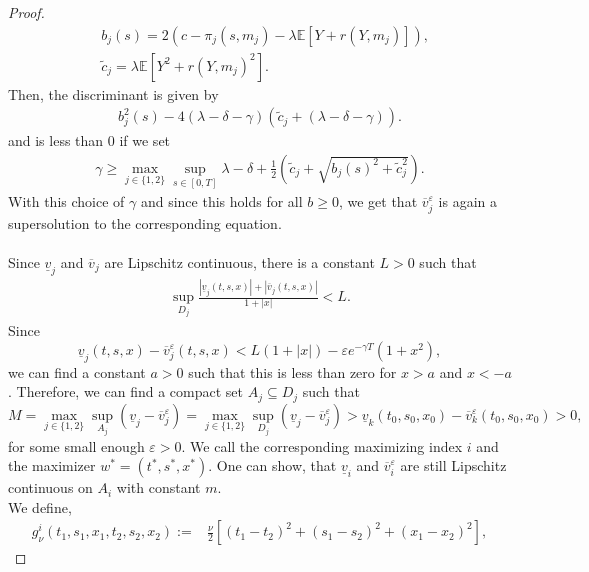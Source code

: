 \documentclass[10pt,a4paper]{amsart}
\begin{document}
\begin{proof}
\begin{align*}
    &b_j(s)=2(c-\pi_j(s,m_j)-\lambda\mathbb{E}[Y+r(Y,m_j)]),\\
    &\tilde{c}_j = \lambda\mathbb{E}[Y^2+r(Y,m_j)^2].
\end{align*}
Then, the discriminant is given by
\begin{align*}
    b_j^2(s)-4(\lambda-\delta - \gamma)(\tilde{c}_j+(\lambda-\delta - \gamma)).
\end{align*}
and is less than 0 if we set 
\begin{align*}
    \gamma\geq  \max_{j \in \{1,2\}}\sup_{s \in [0,T]}\lambda-\delta + \frac{1}{2}\left(\tilde{c}_j+\sqrt{b_j(s)^2+\tilde{c}_j^2}\right).
\end{align*}
With this choice of $\gamma$ and since this holds for all $b\geq0$, we get that $\overline{v}_j^\varepsilon$ is again a supersolution to the corresponding equation. \\ \ \\
    Since $\underline{v}_j$ and $\overline{v}_j$ are Lipschitz continuous, there is a constant $L>0$ such that 
    \begin{align}
    \label{proof:growthcondition}
        \sup_{D_j}\frac{|\underline{v}_j(t,s,x)|+|\overline{v}_j(t,s,x)|}{1+|x|}<L.
    \end{align}
    Since 
    \begin{equation*}
        \underline{v}_j(t,s,x)-\overline{v}^\varepsilon_j(t,s,x)<L(1+|x|)-\varepsilon e^{-\gamma T} (1+x^2),
    \end{equation*}
    we can find a constant $a>0$ such that this is less than zero for $x>a$ and $x<-a$. Therefore, we can find a compact set $A_j \subseteq D_j$ such that
    \begin{equation*}
        M = \max_{j \in \{1,2\}} \sup_{A_j}(\underline{v}_j-\overline{v}_j^\varepsilon)= \max_{j \in \{1,2\}}\sup_{D_j}(\underline{v}_j-\overline{v}_j^\varepsilon)> \underline{v}_k(t_0,s_0,x_0)-\overline{v}_k^\varepsilon(t_0,s_0,x_0)>0,
    \end{equation*}
    for some small enough $\varepsilon>0$. We call the corresponding maximizing index $i$ and the maximizer $w^*=(t^*,s^*,x^*)$. One can show, that $\underline{v}_i$ and $\overline{v}_i^\varepsilon$ are still Lipschitz continuous on $A_i$ with constant $m$. \\
    We define,
    \begin{align*}
        g_\nu^i(t_1,s_1,x_1,t_2,s_2,x_2):=&\frac{\nu}{2}\left[(t_1-t_2)^2+(s_1-s_2)^2+(x_1-x_2)^2\right],

\end{align*}
\end{proof}
\end{document}
